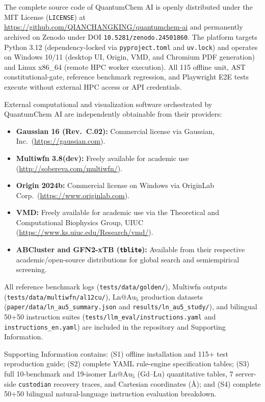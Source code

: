 \documentclass[journal=jcisd8,manuscript=article]{achemso}
\begin{document}
The complete source code of QuantumChem AI is openly distributed under the MIT License (\texttt{LICENSE}) at \url{https://github.com/QIANCHANGKING/quantumchem-ai} and permanently archived on Zenodo under DOI \texttt{10.5281/zenodo.24501860}. The platform targets Python 3.12 (dependency-locked via \texttt{pyproject.toml} and \texttt{uv.lock}) and operates on Windows 10/11 (desktop UI, Origin, VMD, and Chromium PDF generation) and Linux x86\_64 (remote HPC worker execution). All 115 offline unit, AST constitutional-gate, reference benchmark regression, and Playwright E2E tests execute without external HPC access or API credentials.

External computational and visualization software orchestrated by QuantumChem AI are independently obtainable from their providers:
\begin{itemize}
  \item \textbf{Gaussian 16 (Rev.\ C.02):} Commercial license via Gaussian, Inc.\ (\url{https://gaussian.com}).
  \item \textbf{Multiwfn 3.8(dev):} Freely available for academic use (\url{http://sobereva.com/multiwfn/}).
  \item \textbf{Origin 2024b:} Commercial license on Windows via OriginLab Corp.\ (\url{https://www.originlab.com}).
  \item \textbf{VMD:} Freely available for academic use via the Theoretical and Computational Biophysics Group, UIUC (\url{https://www.ks.uiuc.edu/Research/vmd/}).
  \item \textbf{ABCluster and GFN2-xTB (\texttt{tblite}):} Available from their respective academic/open-source distributions for global search and semiempirical screening.
\end{itemize}
All reference benchmark logs (\texttt{tests/data/golden/}), Multiwfn outputs (\texttt{tests/data/multiwfn/al12cu/}), $\mathrm{Ln@Au_5}$ production datasets (\texttt{paper/data/ln\_au5\_summary.json} and \texttt{results/ln\_au5\_study/}), and bilingual 50+50 instruction suites (\texttt{tests/llm\_eval/instructions.yaml} and \texttt{instructions\_en.yaml}) are included in the repository and Supporting Information.

\begin{suppinfo}
Supporting Information contains: (S1) offline installation and 115+ test reproduction guide; (S2) complete YAML rule-engine specification tables; (S3) full 10-benchmark and 19-isomer $\mathrm{Ln@Au_5}$ ($\mathrm{Gd\text{--}Lu}$) quantitative tables, 7 server-side \texttt{custodian} recovery traces, and Cartesian coordinates (\AA); and (S4) complete 50+50 bilingual natural-language instruction evaluation breakdown.
\end{suppinfo}
\end{document}

